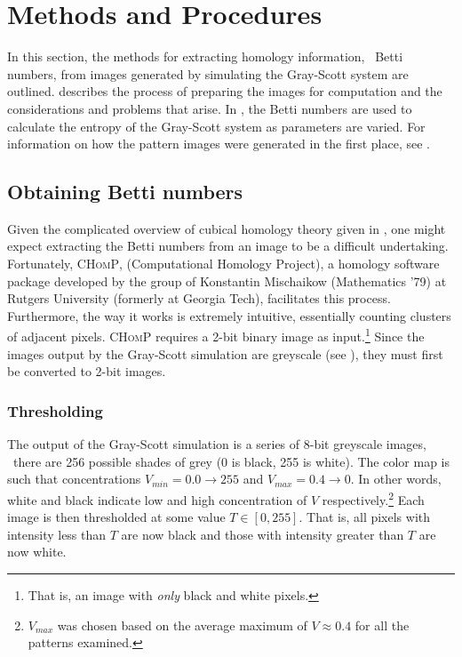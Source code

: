 \chapter{Methods and Procedures} \label{ch:methods}

In this section, the methods for extracting homology information, \ie~Betti numbers, from images generated by simulating the Gray-Scott system are outlined.  describes the process of preparing the images for computation and the considerations and problems that arise. In , the Betti numbers are used to calculate the entropy of the Gray-Scott system as parameters are varied. For information on how the pattern images were generated in the first place, see .

\section{Obtaining Betti numbers} \label{sect:obtainbetti}

Given the complicated overview of cubical homology theory given in , one might expect extracting the Betti numbers from an image to be a difficult undertaking. Fortunately, \textsc{CHomP}, (Computational Homology Project), a homology software package developed by the group of Konstantin Mischaikow (Mathematics '79) at Rutgers University (formerly at Georgia Tech), facilitates this process. Furthermore, the way it works is extremely intuitive, essentially counting clusters of adjacent pixels. \textsc{CHomP} requires a 2-bit binary image as input.\footnote{That is, an image with \emph{only} black and white pixels.} Since the images output by the Gray-Scott simulation are greyscale (see ), they must first be converted to 2-bit images.

\subsection{Thresholding} \label{sect:thresholding}

The output of the Gray-Scott simulation is a series of 8-bit greyscale images, \ie~there are 256 possible shades of grey (0 is black, 255 is white). The color map is such that concentrations $V_{min} = 0.0 \rightarrow 255$ and $V_{max} = 0.4 \rightarrow 0$. In other words, white and black indicate low and high concentration of $V$ respectively.\footnote{$V_{max}$ was chosen based on the average maximum of $V \approx 0.4$ for all the patterns examined.} Each image is then thresholded at some value $T \in [0,255]$. That is, all pixels with intensity less than $T$ are now black and those with intensity greater than $T$ are now white.

